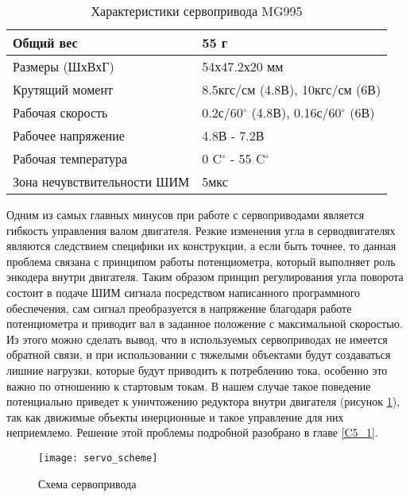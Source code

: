 \begin{table}[h]
	\begin{center}
		\caption{Характеристики сервопривода MG995}
		\label{servoParam}
		\begin{tabular}{| l | l |}
			\hline
			Общий вес   &    55 г \\ \hline
			Размеры (ШхВхГ) & 54х47.2х20 мм\\ \hline
			Крутящий момент & 8.5кгс/см (4.8В), 10кгс/см (6В) \\ \hline
			Рабочая скорость & 0.2с/60$^{\circ}$ (4.8В), 0.16с/60$^{\circ}$ (6В) \\ \hline
			Рабочее напряжение & 4.8В - 7.2В \\ \hline
			Рабочая температура & 0 C$^{\circ}$  - 55 C$^{\circ}$ \\ \hline
			Зона нечувствительности ШИМ & 5мкс \\ \hline
		\end{tabular}
	\end{center}
\end{table} 

Одним из самых главных минусов при работе с сервоприводами является гибкость управления валом двигателя. Резкие изменения угла в серводвигателях являются следствием специфики их конструкции, а если быть точнее, то данная проблема связана с принципом работы потенциометра, который выполняет роль энкодера внутри двигателя. Таким образом принцип регулирования угла поворота состоит в подаче ШИМ сигнала посредством написанного программного обеспечения, сам сигнал преобразуется в напряжение благодаря работе потенциометра и приводит вал в заданное положение с максимальной скоростью. Из этого можно сделать вывод, что в используемых  сервоприводах не имеется обратной связи, и при использовании с тяжелыми объектами будут создаваться лишние нагрузки, которые будут приводить к потреблению тока, особенно это важно по отношению к стартовым токам. В нашем случае такое поведение потенциально приведет к уничтожению редуктора внутри двигателя (рисунок \ref{servo_scheme}), так как движимые объекты инерционные и такое управление для них неприемлемо. Решение этой проблемы подробной разобрано в главе \ref{C5_1}. 

\begin{figure}[h!]
	\begin{center}
		\texttt{[image: servo\_scheme]}
		\caption{Схема сервопривода}
		\label{servo_scheme}
	\end{center}
\end{figure}


